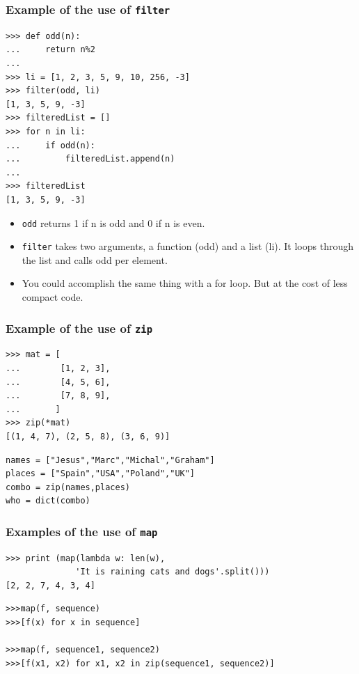 \documentclass{beamer}
\begin{document}
\begin{frame}[containsverbatim]
\frametitle{Example of the use of \texttt{filter}}
\begin{lstlisting}
>>> def odd(n):           
...     return n%2
...     
>>> li = [1, 2, 3, 5, 9, 10, 256, -3]
>>> filter(odd, li)       
[1, 3, 5, 9, -3]
>>> filteredList = []
>>> for n in li:          
...     if odd(n):
...         filteredList.append(n)
...     
>>> filteredList
[1, 3, 5, 9, -3]
\end{lstlisting}
\begin{itemize}
\item \texttt{odd} returns 1 if n is odd and 0 if n is even.
\item \texttt{filter} takes two arguments, a function (odd) and a list (li). It loops through the list and calls odd per element.
\item You could accomplish the same thing with a for loop. But at the cost of less compact code. 
\end{itemize}
\end{frame}

\begin{frame}[containsverbatim]
\frametitle{Example of the use of \texttt{zip}}
\begin{lstlisting}
>>> mat = [
...        [1, 2, 3],
...        [4, 5, 6],
...        [7, 8, 9],
...       ]
>>> zip(*mat)
[(1, 4, 7), (2, 5, 8), (3, 6, 9)]
\end{lstlisting}
\begin{lstlisting}
names = ["Jesus","Marc","Michal","Graham"]
places = ["Spain","USA","Poland","UK"]
combo = zip(names,places)
who = dict(combo)
\end{lstlisting}
\end{frame}

\begin{frame}[containsverbatim]
\frametitle{Examples of the use of \texttt{map}}
\begin{lstlisting}
>>> print (map(lambda w: len(w), 
              'It is raining cats and dogs'.split()))
[2, 2, 7, 4, 3, 4]
\end{lstlisting}

\begin{lstlisting}
>>>map(f, sequence)
>>>[f(x) for x in sequence]

>>>map(f, sequence1, sequence2)
>>>[f(x1, x2) for x1, x2 in zip(sequence1, sequence2)]
\end{lstlisting}
\end{frame}
\end{document}
